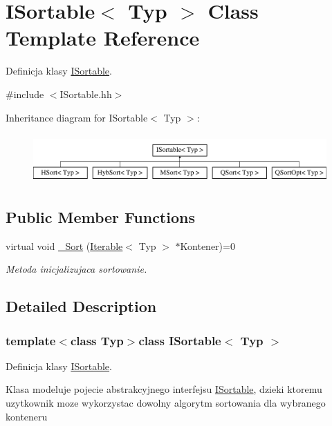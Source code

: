 \hypertarget{class_i_sortable}{\section{I\-Sortable$<$ Typ $>$ Class Template Reference}
\label{class_i_sortable}
}


Definicja klasy \hyperlink{class_i_sortable}{I\-Sortable}.  




{\ttfamily \#include $<$I\-Sortable.\-hh$>$}

Inheritance diagram for I\-Sortable$<$ Typ $>$\-:\begin{figure}[H]
\begin{center}
\leavevmode
\includegraphics[height=1.898305cm]{class_i_sortable}
\end{center}
\end{figure}
\subsection*{Public Member Functions}
\begin{DoxyCompactItemize}
\item 
virtual void \hyperlink{class_i_sortable_aca218e19355fb5d0e6ac7b29ea17dc59}{\-\_\-\-Sort} (\hyperlink{class_iterable}{Iterable}$<$ Typ $>$ $\ast$Kontener)=0
\begin{DoxyCompactList}\small\item\em Metoda inicjalizujaca sortowanie. \end{DoxyCompactList}\end{DoxyCompactItemize}


\subsection{Detailed Description}
\subsubsection*{template$<$class Typ$>$class I\-Sortable$<$ Typ $>$}

Definicja klasy \hyperlink{class_i_sortable}{I\-Sortable}. 

Klasa modeluje pojecie abstrakcyjnego interfejsu \hyperlink{class_i_sortable}{I\-Sortable}, dzieki ktoremu uzytkownik moze wykorzystac dowolny algorytm sortowania dla wybranego konteneru 

